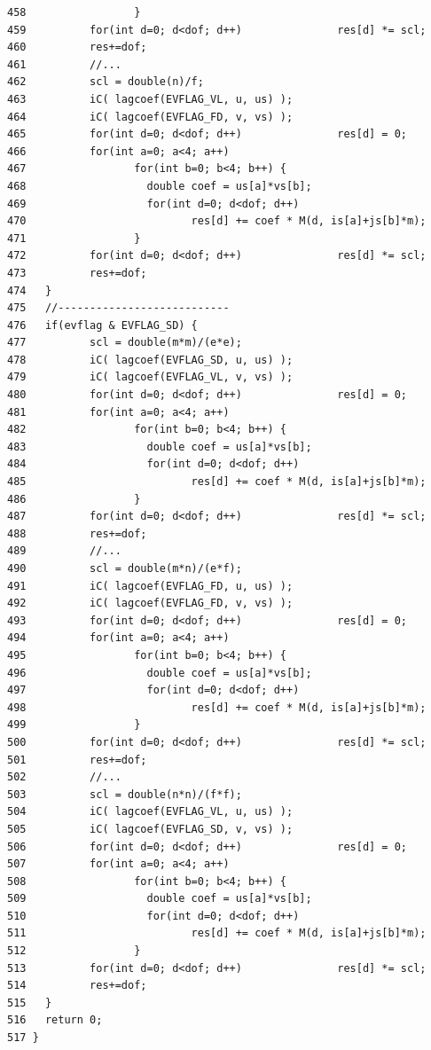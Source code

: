 \begin{verbatim}
458                 }
459          for(int d=0; d<dof; d++)               res[d] *= scl;
460          res+=dof;
461          //...
462          scl = double(n)/f;
463          iC( lagcoef(EVFLAG_VL, u, us) );
464          iC( lagcoef(EVFLAG_FD, v, vs) );
465          for(int d=0; d<dof; d++)               res[d] = 0;
466          for(int a=0; a<4; a++)
467                 for(int b=0; b<4; b++) {
468                   double coef = us[a]*vs[b]; 
469                   for(int d=0; d<dof; d++)
470                          res[d] += coef * M(d, is[a]+js[b]*m);
471                 }
472          for(int d=0; d<dof; d++)               res[d] *= scl;
473          res+=dof;
474   }
475   //---------------------------
476   if(evflag & EVFLAG_SD) {
477          scl = double(m*m)/(e*e);
478          iC( lagcoef(EVFLAG_SD, u, us) );
479          iC( lagcoef(EVFLAG_VL, v, vs) );
480          for(int d=0; d<dof; d++)               res[d] = 0;
481          for(int a=0; a<4; a++)
482                 for(int b=0; b<4; b++) {
483                   double coef = us[a]*vs[b]; 
484                   for(int d=0; d<dof; d++)
485                          res[d] += coef * M(d, is[a]+js[b]*m);
486                 }
487          for(int d=0; d<dof; d++)               res[d] *= scl;
488          res+=dof;
489          //...
490          scl = double(m*n)/(e*f);
491          iC( lagcoef(EVFLAG_FD, u, us) );
492          iC( lagcoef(EVFLAG_FD, v, vs) );
493          for(int d=0; d<dof; d++)               res[d] = 0;
494          for(int a=0; a<4; a++)
495                 for(int b=0; b<4; b++) {
496                   double coef = us[a]*vs[b]; 
497                   for(int d=0; d<dof; d++)
498                          res[d] += coef * M(d, is[a]+js[b]*m);
499                 }
500          for(int d=0; d<dof; d++)               res[d] *= scl;
501          res+=dof;
502          //...
503          scl = double(n*n)/(f*f);
504          iC( lagcoef(EVFLAG_VL, u, us) );
505          iC( lagcoef(EVFLAG_SD, v, vs) );
506          for(int d=0; d<dof; d++)               res[d] = 0;
507          for(int a=0; a<4; a++)
508                 for(int b=0; b<4; b++) {
509                   double coef = us[a]*vs[b]; 
510                   for(int d=0; d<dof; d++)
511                          res[d] += coef * M(d, is[a]+js[b]*m);
512                 }
513          for(int d=0; d<dof; d++)               res[d] *= scl;
514          res+=dof;
515   }
516   return 0;
517 }
\end{verbatim}\normalsize 


